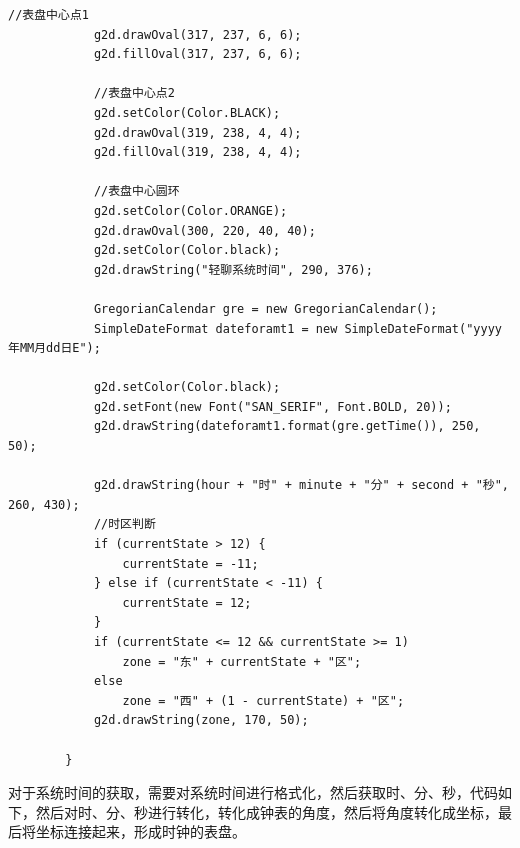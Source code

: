 \documentclass[UTF8,12pt]{article}
\begin{document}
\begin{lstlisting}[title=时钟面板的绘制,frame=shadowbox]
            //表盘中心点1
            g2d.drawOval(317, 237, 6, 6);
            g2d.fillOval(317, 237, 6, 6);

            //表盘中心点2
            g2d.setColor(Color.BLACK);
            g2d.drawOval(319, 238, 4, 4);
            g2d.fillOval(319, 238, 4, 4);

            //表盘中心圆环
            g2d.setColor(Color.ORANGE);
            g2d.drawOval(300, 220, 40, 40);
            g2d.setColor(Color.black);
            g2d.drawString("轻聊系统时间", 290, 376);

            GregorianCalendar gre = new GregorianCalendar();
            SimpleDateFormat dateforamt1 = new SimpleDateFormat("yyyy年MM月dd日E");

            g2d.setColor(Color.black);
            g2d.setFont(new Font("SAN_SERIF", Font.BOLD, 20));
            g2d.drawString(dateforamt1.format(gre.getTime()), 250, 50);

            g2d.drawString(hour + "时" + minute + "分" + second + "秒", 260, 430);
            //时区判断
            if (currentState > 12) {
                currentState = -11;
            } else if (currentState < -11) {
                currentState = 12;
            }
            if (currentState <= 12 && currentState >= 1)
                zone = "东" + currentState + "区";
            else
                zone = "西" + (1 - currentState) + "区";
            g2d.drawString(zone, 170, 50);

        }
\end{lstlisting}

对于系统时间的获取，需要对系统时间进行格式化，然后获取时、分、秒，代码如下，然后对时、分、秒进行转化，转化成钟表的角度，然后将角度转化成坐标，最后将坐标连接起来，形成时钟的表盘。
\end{document}

